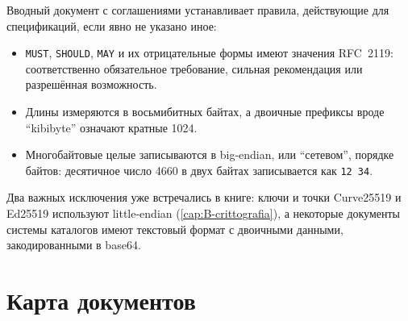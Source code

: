 Вводный документ с соглашениями устанавливает правила, действующие для спецификаций, если явно не указано иное:
\begin{itemize}
  \item \texttt{MUST}, \texttt{SHOULD}, \texttt{MAY} и их отрицательные формы имеют значения RFC~2119: соответственно обязательное требование, сильная рекомендация или разрешённая возможность.
  \item Длины измеряются в восьмибитных байтах, а двоичные префиксы вроде \enquote{kibibyte} означают кратные 1024.
  \item Многобайтовые целые записываются в big-endian, или \enquote{сетевом}, порядке байтов: десятичное число 4660 в двух байтах записывается как \texttt{12 34}.
\end{itemize}
Два важных исключения уже встречались в книге: ключи и точки Curve25519 и Ed25519 используют little-endian (\cref{cap:B-crittografia}), а некоторые документы системы каталогов имеют текстовый формат с двоичными данными, закодированными в base64.

\section{Карта документов}\label{sec:C-mappa}

